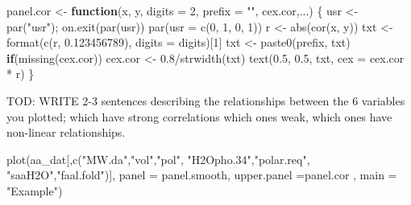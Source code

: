 \documentclass[
]{book}
\newenvironment{Shaded}{\begin{snugshade}}{\end{snugshade}}
\newcommand{\AttributeTok}[1]{\textcolor[rgb]{0.77,0.63,0.00}{#1}}
\newcommand{\ControlFlowTok}[1]{\textcolor[rgb]{0.13,0.29,0.53}{\textbf{#1}}}
\newcommand{\DecValTok}[1]{\textcolor[rgb]{0.00,0.00,0.81}{#1}}
\newcommand{\FloatTok}[1]{\textcolor[rgb]{0.00,0.00,0.81}{#1}}
\newcommand{\FunctionTok}[1]{\textcolor[rgb]{0.00,0.00,0.00}{#1}}
\newcommand{\NormalTok}[1]{#1}
\newcommand{\OtherTok}[1]{\textcolor[rgb]{0.56,0.35,0.01}{#1}}
\newcommand{\SpecialCharTok}[1]{\textcolor[rgb]{0.00,0.00,0.00}{#1}}
\newcommand{\StringTok}[1]{\textcolor[rgb]{0.31,0.60,0.02}{#1}}
\begin{document}
\begin{Shaded}
\begin{Highlighting}[]
\NormalTok{panel.cor }\OtherTok{\textless{}{-}} \ControlFlowTok{function}\NormalTok{(x, y, }\AttributeTok{digits =} \DecValTok{2}\NormalTok{, }\AttributeTok{prefix =} \StringTok{""}\NormalTok{, cex.cor,...)}
\NormalTok{\{}
\NormalTok{    usr }\OtherTok{\textless{}{-}} \FunctionTok{par}\NormalTok{(}\StringTok{"usr"}\NormalTok{); }\FunctionTok{on.exit}\NormalTok{(}\FunctionTok{par}\NormalTok{(usr))}
    \FunctionTok{par}\NormalTok{(}\AttributeTok{usr =} \FunctionTok{c}\NormalTok{(}\DecValTok{0}\NormalTok{, }\DecValTok{1}\NormalTok{, }\DecValTok{0}\NormalTok{, }\DecValTok{1}\NormalTok{))}
\NormalTok{    r }\OtherTok{\textless{}{-}} \FunctionTok{abs}\NormalTok{(}\FunctionTok{cor}\NormalTok{(x, y))}
\NormalTok{    txt }\OtherTok{\textless{}{-}} \FunctionTok{format}\NormalTok{(}\FunctionTok{c}\NormalTok{(r, }\FloatTok{0.123456789}\NormalTok{), }\AttributeTok{digits =}\NormalTok{ digits)[}\DecValTok{1}\NormalTok{]}
\NormalTok{    txt }\OtherTok{\textless{}{-}} \FunctionTok{paste0}\NormalTok{(prefix, txt)}
    \ControlFlowTok{if}\NormalTok{(}\FunctionTok{missing}\NormalTok{(cex.cor)) cex.cor }\OtherTok{\textless{}{-}} \FloatTok{0.8}\SpecialCharTok{/}\FunctionTok{strwidth}\NormalTok{(txt)}
    \FunctionTok{text}\NormalTok{(}\FloatTok{0.5}\NormalTok{, }\FloatTok{0.5}\NormalTok{, txt, }\AttributeTok{cex =}\NormalTok{ cex.cor }\SpecialCharTok{*}\NormalTok{ r)}
\NormalTok{\}}
\end{Highlighting}
\end{Shaded}

TOD: WRITE 2-3 sentences describing the relationships between the 6 variables you plotted; which have strong correlations which ones weak, which ones have non-linear relationships.

\begin{Shaded}
\begin{Highlighting}[]
\FunctionTok{plot}\NormalTok{(aa\_dat[,}\FunctionTok{c}\NormalTok{(}\StringTok{"MW.da"}\NormalTok{,}\StringTok{"vol"}\NormalTok{,}\StringTok{"pol"}\NormalTok{,}
               \StringTok{"H2Opho.34"}\NormalTok{,}\StringTok{"polar.req"}\NormalTok{,}
               \StringTok{"saaH2O"}\NormalTok{,}\StringTok{"faal.fold"}\NormalTok{)],}
     \AttributeTok{panel =}\NormalTok{ panel.smooth,}
      \AttributeTok{upper.panel =}\NormalTok{panel.cor ,}
     \AttributeTok{main =} \StringTok{"Example"}\NormalTok{)}
\end{Highlighting}
\end{Shaded}
\end{document}
